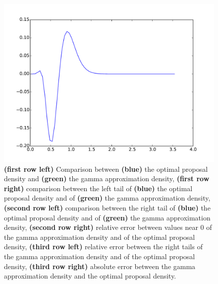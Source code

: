 \documentclass{article}
\begin{document}
\begin{figure}[htb]
\begin{minipage}{.45\textwidth}
	\end{minipage}
	\begin{minipage}{.45\textwidth}
		\centering
		\includegraphics[width=0.97\linewidth]{bootstrap-filter/absolute_simple_3_3.pdf}
	\end{minipage}
	\caption{\textbf{(first row left)} Comparison between \textbf{(blue)} the optimal proposal density and \textbf{(green)} the gamma approximation density, \textbf{(first row right)} comparison between  the left tail of \textbf{(blue)} the optimal proposal density and of \textbf{(green)} the gamma approximation density, \textbf{(second row left)} comparison between the right tail of \textbf{(blue)} the optimal proposal density and of \textbf{(green)} the gamma approximation density, \textbf{(second row right)} relative error between values near 0 of the gamma approximation density and of the optimal proposal density, \textbf{(third row left)} relative error between the right tails of the gamma approximation density and of the optimal proposal density, \textbf{(third row right)} absolute error between the gamma approximation density and the optimal proposal density.}
	\label{fig:simple}
\end{figure}
\end{document}
